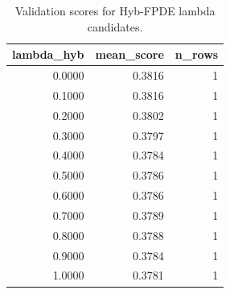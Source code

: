 \begin{table}[t]
\caption{Validation scores for Hyb-FPDE lambda candidates.}
\label{tab:lambda_distribution_computed}
\centering
\begin{tabular}{rrr}
\toprule
lambda\_hyb & mean\_score & n\_rows \\
\midrule
0.0000 & 0.3816 & 1 \\
0.1000 & 0.3816 & 1 \\
0.2000 & 0.3802 & 1 \\
0.3000 & 0.3797 & 1 \\
0.4000 & 0.3784 & 1 \\
0.5000 & 0.3786 & 1 \\
0.6000 & 0.3786 & 1 \\
0.7000 & 0.3789 & 1 \\
0.8000 & 0.3788 & 1 \\
0.9000 & 0.3784 & 1 \\
1.0000 & 0.3781 & 1 \\
\bottomrule
\end{tabular}

\end{table}
